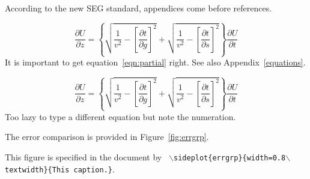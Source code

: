 \documentclass[paper,revised]{geophysics}
\begin{document}
\label{example}

According to the new SEG standard, appendices come before references.

\begin{equation}
\frac{\partial U}{\partial z} = 
\left\{
  \sqrt{\frac{1}{v^2} - \left[\frac{\partial t}{\partial g}\right]^2} +
  \sqrt{\frac{1}{v^2} - \left[\frac{\partial t}{\partial s}\right]^2}
\right\}
\frac{\partial U}{\partial t}
\label{eqn:partial}
\end{equation}
It is important to get equation~\ref{eqn:partial} right. See also
Appendix~\ref{equations}.


\begin{equation}
\frac{\partial U}{\partial z} = 
\left\{
  \sqrt{\frac{1}{v^2} - \left[\frac{\partial t}{\partial g}\right]^2} +
  \sqrt{\frac{1}{v^2} - \left[\frac{\partial t}{\partial s}\right]^2}
\right\}
\frac{\partial U}{\partial t}
\label{eqn:partial2}
\end{equation}
Too lazy to type a different equation but note the numeration.

The error comparison is provided in Figure~\ref{fig:errgrp}.

{This figure is specified in the document by \texttt{
    $\backslash$sideplot\{errgrp\}\{width=0.8$\backslash$text\-width\}\{This caption.\}}.
}







\newpage


\end{document}

